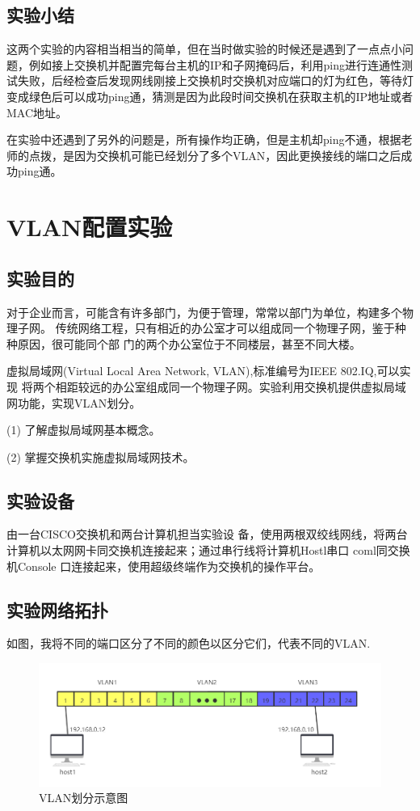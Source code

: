 \documentclass[lang=cn,11pt,a4paper,cite=authoryear]{elegantpaper}
\begin{document}
\subsection{实验小结}

这两个实验的内容相当相当的简单，但在当时做实验的时候还是遇到了一点点小问题，例如接上交换机并配置完每台主机的IP和子网掩码后，利用ping进行连通性测试失败，后经检查后发现网线刚接上交换机时交换机对应端口的灯为红色，等待灯变成绿色后可以成功ping通，猜测是因为此段时间交换机在获取主机的IP地址或者MAC地址。

在实验中还遇到了另外的问题是，所有操作均正确，但是主机却ping不通，根据老师的点拨，是因为交换机可能已经划分了多个VLAN，因此更换接线的端口之后成功ping通。

\section{VLAN配置实验}
\subsection{实验目的}

对于企业而言，可能含有许多部门，为便于管理，常常以部门为单位，构建多个物理子网。 传统网络工程，只有相近的办公室才可以组成同一个物理子网，鉴于种种原因，很可能同个部 门的两个办公室位于不同楼层，甚至不同大楼。

虚拟局域网(Virtual Local Area Network, VLAN),标准编号为IEEE 802.IQ,可以实现 将两个相距较远的办公室组成同一个物理子网。实验利用交换机提供虚拟局域网功能，实现VLAN划分。

(1)	了解虚拟局域网基本概念。

(2)	掌握交换机实施虚拟局域网技术。


\subsection{实验设备}

由一台CISCO交换机和两台计算机担当实验设 备，使用两根双绞线网线，将两台计算机以太网网卡同交换机连接起来；通过串行线将计算机Hostl串口 coml同交换机Console 口连接起来，使用超级终端作为交换机的操作平台。


\subsection{实验网络拓扑}

如图，我将不同的端口区分了不同的颜色以区分它们，代表不同的VLAN.

\begin{figure}[htbp]
	\centering
	\includegraphics[width=0.7\linewidth]{image/screenshot017}
	\caption{VLAN划分示意图}
	\label{fig:screenshot017}
\end{figure}
\end{document}

